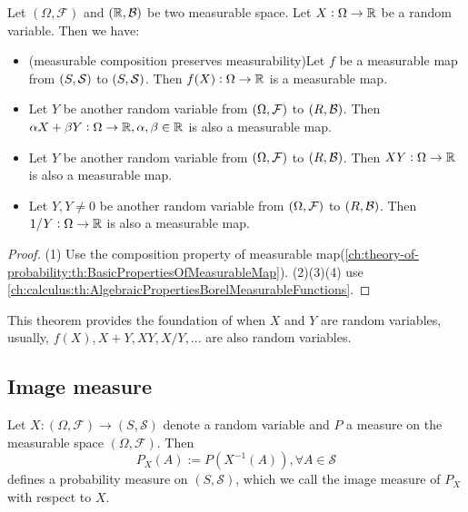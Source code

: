 \begin{refsection}
\begin{lemma}\label{ch:theory-of-probability:th:BasicMeasurabilityPropertyRandomVariables}
Let $(\Omega,\mathcal{F})$ and $(\mathbb{R},\mathcal{B})$ be two measurable space. Let $X:\Omega \rightarrow \mathbb{R}$ be a random variable. Then we have:
\begin{itemize}
	\item  (measurable composition preserves measurability)Let $f$ be a measurable map from $(S,\mathcal{S})$ to $(S,\mathcal{S})$. Then $f(X): \Omega \to \mathbb{R}$ is a measurable map.
	\item Let $Y$ be another random variable from $(\Omega,\mathcal{F})$ to $(R,\mathcal{B})$. Then $\alpha X + \beta Y: \Omega \to \mathbb{R}, \alpha,\beta\in \mathbb{R}$ is also a measurable map.
	\item Let $Y$ be another random variable from $(\Omega,\mathcal{F})$ to $(R,\mathcal{B})$. Then $XY: \Omega \to \mathbb{R}$ is also a measurable map.
	\item Let $Y, Y\neq 0$ be another random variable from $(\Omega,\mathcal{F})$ to $(R,\mathcal{B})$. Then $1/Y: \Omega \to \mathbb{R}$ is also a measurable map.
\end{itemize}	
\end{lemma}
\begin{proof}
(1) Use the composition property of measurable map(\autoref{ch:theory-of-probability:th:BasicPropertiesOfMeasurableMap}).	(2)(3)(4) use \autoref{ch:calculus:th:AlgebraicPropertiesBorelMeasurableFunctions}.
\end{proof}

\begin{remark}[implications]
This theorem provides the foundation of when $X$ and $Y$ are random variables, usually, $f(X), X+Y, XY, X/Y,...$ are also random variables. 	
\end{remark}

\subsection{Image measure}
\begin{definition}\cite{fries2007mathematical}
Let $X:(\Omega,\mathcal{F})\rightarrow (S,\mathcal{S})$ denote a random variable and $P$ a measure on the measurable space $(\Omega,\mathcal{F})$. Then
$$P_{X}(A):=P(X^{-1}(A)),\forall A \in \mathcal{S}$$
defines a probability measure on $(S,\mathcal{S})$, which we call the image measure of $P_X$ with respect to $X$.
\end{definition}





\end{refsection}
